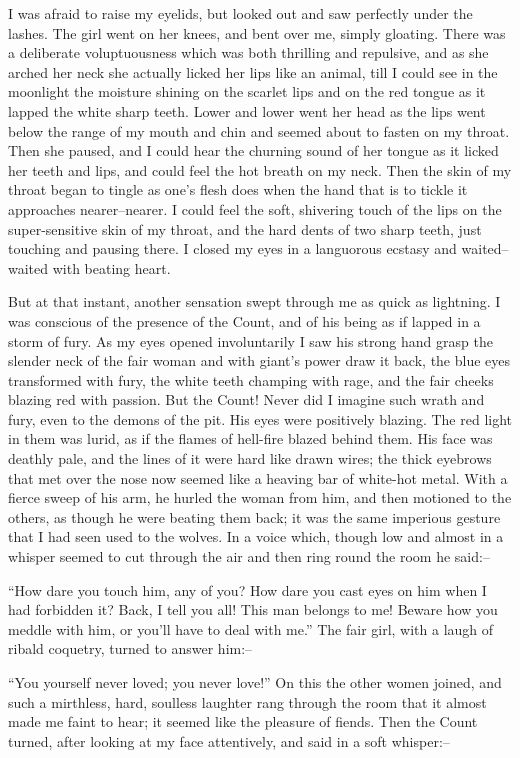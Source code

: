 \documentclass[12pt,openright]{book}
\begin{document}
I was afraid to raise my eyelids, but looked out and saw perfectly under the lashes. The girl went on her knees, and bent over me, simply gloating. There was a deliberate voluptuousness which was both thrilling and repulsive, and as she arched her neck she actually licked her lips like an animal, till I could see in the moonlight the moisture shining on the scarlet lips and on the red tongue as it lapped the white sharp teeth. Lower and lower went her head as the lips went below the range of my mouth and chin and seemed about to fasten on my throat. Then she paused, and I could hear the churning sound of her tongue as it licked her teeth and lips, and could feel the hot breath on my neck. Then the skin of my throat began to tingle as one’s flesh does when the hand that is to tickle it approaches nearer–nearer. I could feel the soft, shivering touch of the lips on the super-sensitive skin of my throat, and the hard dents of two sharp teeth, just touching and pausing there. I closed my eyes in a languorous ecstasy and waited–waited with beating heart.

But at that instant, another sensation swept through me as quick as lightning. I was conscious of the presence of the Count, and of his being as if lapped in a storm of fury. As my eyes opened involuntarily I saw his strong hand grasp the slender neck of the fair woman and with giant’s power draw it back, the blue eyes transformed with fury, the white teeth champing with rage, and the fair cheeks blazing red with passion. But the Count! Never did I imagine such wrath and fury, even to the demons of the pit. His eyes were positively blazing. The red light in them was lurid, as if the flames of hell-fire blazed behind them. His face was deathly pale, and the lines of it were hard like drawn wires; the thick eyebrows that met over the nose now seemed like a heaving bar of white-hot metal. With a fierce sweep of his arm, he hurled the woman from him, and then motioned to the others, as though he were beating them back; it was the same imperious gesture that I had seen used to the wolves. In a voice which, though low and almost in a whisper seemed to cut through the air and then ring round the room he said:–

“How dare you touch him, any of you? How dare you cast eyes on him when I had forbidden it? Back, I tell you all! This man belongs to me! Beware how you meddle with him, or you’ll have to deal with me.” The fair girl, with a laugh of ribald coquetry, turned to answer him:–

“You yourself never loved; you never love!” On this the other women joined, and such a mirthless, hard, soulless laughter rang through the room that it almost made me faint to hear; it seemed like the pleasure of fiends. Then the Count turned, after looking at my face attentively, and said in a soft whisper:–
\end{document}
